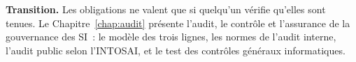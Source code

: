 \bigskip

\begin{boxinfo}
\textbf{Transition.} Les obligations ne valent que si quelqu'un vérifie
qu'elles sont tenues. Le Chapitre~\ref{chap:audit} présente l'audit, le
contrôle et l'assurance de la gouvernance des SI~: le modèle des trois
lignes, les normes de l'audit interne, l'audit public selon l'INTOSAI, et
le test des contrôles généraux informatiques.
\end{boxinfo}
